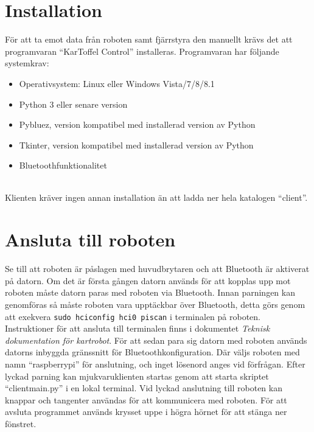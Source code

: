 \documentclass{article}
\begin{document}
\section{Installation}
För att ta emot data från roboten samt fjärrstyra den manuellt krävs det att programvaran ``KarToffel Control'' installeras. Programvaran har följande systemkrav:
\begin{itemize}
    \item Operativsystem: Linux eller Windows Vista/7/8/8.1
    \item Python 3 eller senare version
    \item Pybluez, version kompatibel med installerad version av Python
    \item Tkinter, version kompatibel med installerad version av Python
    \item Bluetoothfunktionalitet
\end{itemize}
\ \\
Klienten kräver ingen annan installation än att ladda ner hela katalogen ``client''.

\clearpage
\section{Ansluta till roboten}
Se till att roboten är påslagen med huvudbrytaren och att Bluetooth är aktiverat på datorn. Om det är första gången datorn används för att kopplas upp mot roboten måste datorn paras med roboten via Bluetooth.
\newline\newline
Innan parningen kan genomföras så måste roboten vara upptäckbar över Bluetooth, detta görs genom att exekvera \colorbox{backcolour}{\lstinline{sudo hciconfig hci0 piscan}} i terminalen på roboten. Instruktioner för att ansluta till terminalen finns i dokumentet \textit{Teknisk dokumentation för kartrobot}.
\newline\newline
För att sedan para sig datorn med roboten används datorns inbyggda gränssnitt för Bluetoothkonfiguration. Där väljs roboten med namn ``raspberrypi'' för anslutning, och inget lösenord anges vid förfrågan. Efter lyckad parning kan mjukvaruklienten startas genom att starta skriptet ``client\textunderscore main.py'' i en lokal terminal. Vid lyckad anslutning till roboten kan knappar och tangenter användas för att kommunicera med roboten. För att avsluta programmet används krysset uppe i högra hörnet för att stänga ner fönstret.

\clearpage
\end{document}
